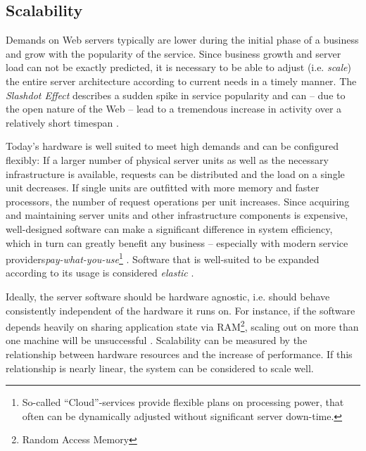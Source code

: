 \subsection{Scalability}
Demands on Web servers typically are lower during the initial phase of a business and grow with the popularity of the service. Since business growth and server load can not be exactly predicted, it is necessary to be able to adjust (i.e. \textit{scale}) the entire server architecture according to current needs in a timely manner. The \textit{Slashdot Effect} describes a sudden spike in service popularity and can -- due to the open nature of the Web -- lead to a tremendous increase in activity over a relatively short timespan \cite[p. 1]{Drolia2010}. 

Today's hardware is well suited to meet high demands and can be configured flexibly: If a larger number of physical server units as well as the necessary infrastructure is available, requests can be distributed and the load on a single unit decreases. If single units are outfitted with more memory and faster processors, the number of request operations per unit increases. Since acquiring and maintaining server units and other infrastructure components is expensive, well-designed software can make a significant difference in system efficiency, which in turn can greatly benefit any business -- especially with modern service providers\textit{pay-what-you-use}\footnote{So-called ``Cloud''-services provide flexible plans on processing power, that often can be dynamically adjusted without significant server down-time.} \cite[p. 11]{Hughes-Croucher2012}. Software that is well-suited to be expanded according to its usage is considered \textit{elastic} \cite{reactive}.

Ideally, the server software should be hardware agnostic, i.e. should behave consistently independent of the hardware it runs on. For instance, if the software depends heavily on sharing application state via RAM\footnote{Random Access Memory}, scaling out on more than one machine will be unsuccessful \cite{Veal2007}. Scalability can be measured by the relationship between hardware resources and the increase of performance. If this relationship is nearly linear, the system can be considered to scale well.

